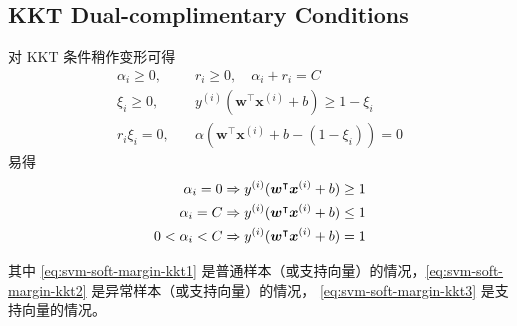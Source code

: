 	\subsection{KKT Dual-complimentary Conditions}
		对 KKT 条件稍作变形可得
		\begin{align*}
			\alpha_i \geq 0, \quad & r_i \geq 0, \quad \alpha_i + r_i = C \\
			\xi_i \geq 0, \quad & y^{(i)} ( \bm{w}^\intercal \bm{x}^{(i)} + b ) \geq 1 - \xi_i \\
			r_i \xi_i = 0, \quad & \alpha \left( \bm{w}^\intercal \bm{x}^{(i)} + b - (1-\xi_i) \right) = 0
		\end{align*}
		易得
		\begin{align}
			\alpha_i = 0 & \Rightarrow y^{(i)} ( \bm{w}^\intercal \bm{x}^{(i)} + b ) \geq 1 \label{eq:svm-soft-margin-kkt1} \\ 
			\alpha_i = C & \Rightarrow y^{(i)} ( \bm{w}^\intercal \bm{x}^{(i)} + b ) \leq 1 \label{eq:svm-soft-margin-kkt2} \\
			0 < \alpha_i < C & \Rightarrow y^{(i)} ( \bm{w}^\intercal \bm{x}^{(i)} + b ) = 1\label{eq:svm-soft-margin-kkt3}		
		\end{align}
		
		其中 \eqref{eq:svm-soft-margin-kkt1} 是普通样本（或支持向量）的情况，\eqref{eq:svm-soft-margin-kkt2} 是异常样本（或支持向量）的情况，
		\eqref{eq:svm-soft-margin-kkt3} 是支持向量的情况。
